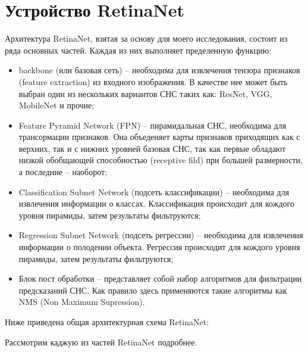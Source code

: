 \section{Устройство RetinaNet}

Архитектура RetinaNet, взятая за основу для моего исследования, состоит из ряда основных частей. Каждая из них выполняет пределенную функцию:
\begin{itemize}
    \item backbone (или базовая сеть) -- необходима для извлечения тензора признаков (feature extraction) из входного изображения. В качестве нее может быть выбран один из нескольких вариантов СНС таких как: ResNet, VGG, MobileNet и прочие;
    \item Feature Pyramid Network (FPN) -- пирамидальная СНС, необходима для трансормации признаков. Она объеденяет карты признаков приходящих как с верхних, так и с нижних уровней базовая СНС, так как первые обладают низкой обобщающей способностью (receptive fild) при большей размерности, а последние -- наоборот;
    \item Classification Subnet Network (подсеть классификации) -- необходима для извлечения информации о классах. Классификация происходит для кождого уровня пирамиды, затем результаты фильтруются;
    \item Regression Subnet Network (подсеть регрессии) -- необходима для извлечения информации о полодении объекта. Регрессия происходит для кождого уровня пирамиды, затем результаты фильтруются;
    \item Блок пост обработки -- представляет собой набор алгоритмов для фильтрации предсказаний СНС. Как правило здесь применяются такие алгоритмы как NMS (Non Maximum Supression).
\end{itemize}

Ниже приведена общая архитектурная схема RetinaNet:


Рассмотрим каджую из частей RetinaNet подробнее.








\clearpage